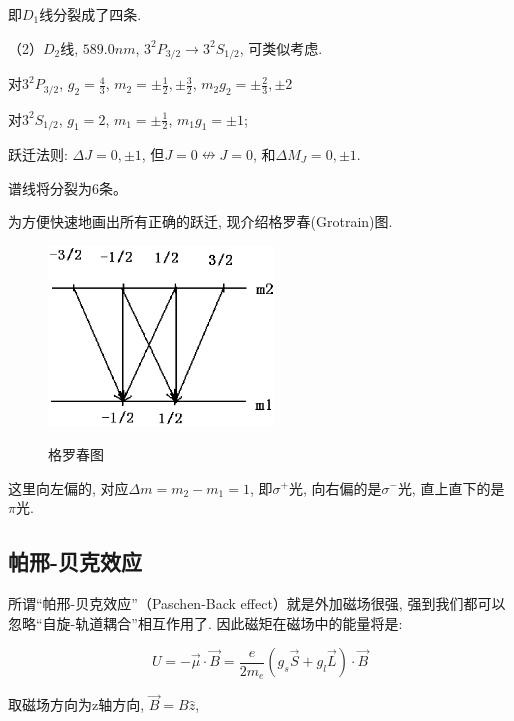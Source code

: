 即$D_1$线分裂成了四条.



（2）$D_2线$, $589.0nm$, $3^2P_{3/2} \to 3^2S_{1/2}$, 可类似考虑.

对$3^2P_{3/2}$, $g_2 =\frac{4}{3}$, $m_2=\pm \frac{1}{2}, \pm
\frac{3}{2}$, $m_2 g_2 = \pm \frac{2}{3}, \pm 2$

对$3^2S_{1/2}$, $g_1 = 2$, $m_1=\pm \frac{1}{2}$, $m_1g_1=\pm 1$;

跃迁法则: $\Delta J =0, \pm1$, 但$J=0 \nleftrightarrow J=0$,
和$\Delta M_J =0, \pm 1$.

谱线将分裂为6条。

为方便快速地画出所有正确的跃迁, 现介绍格罗春(Grotrain)图.


\begin{figure}[h]
\begin{center}
  \includegraphics[width=6cm]{Spectrum/grotrain.ps}\\
  \caption{格罗春图}\label{Grotrain graph}
\end{center}
\end{figure}

这里向左偏的, 对应$\Delta m = m_2 -m_1=1$, 即$\sigma^+$光,
向右偏的是$\sigma^-$光, 直上直下的是$\pi$光.


\subsection{帕邢-贝克效应}

所谓``帕邢-贝克效应''（Paschen-Back effect）就是外加磁场很强,
强到我们都可以忽略``自旋-轨道耦合''相互作用了.
因此磁矩在磁场中的能量将是:


\begin{equation*}
U = -\vec \mu \cdot \vec B = \frac{e}{2m_e}\left(g_s \vec S + g_l
\vec L \right)\cdot \vec B
\end{equation*}

取磁场方向为z轴方向, $\vec B = B \hat z$,

